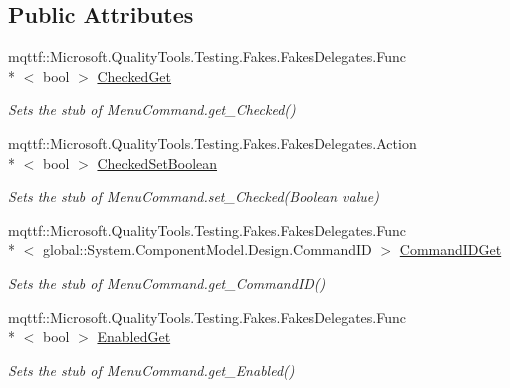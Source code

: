 \subsection*{Public Attributes}
\begin{DoxyCompactItemize}
\item 
mqttf\-::\-Microsoft.\-Quality\-Tools.\-Testing.\-Fakes.\-Fakes\-Delegates.\-Func\\*
$<$ bool $>$ \hyperlink{class_system_1_1_component_model_1_1_design_1_1_fakes_1_1_stub_designer_verb_a52821b4b0a2a7b93e48dc9760683f169}{Checked\-Get}
\begin{DoxyCompactList}\small\item\em Sets the stub of Menu\-Command.\-get\-\_\-\-Checked()\end{DoxyCompactList}\item 
mqttf\-::\-Microsoft.\-Quality\-Tools.\-Testing.\-Fakes.\-Fakes\-Delegates.\-Action\\*
$<$ bool $>$ \hyperlink{class_system_1_1_component_model_1_1_design_1_1_fakes_1_1_stub_designer_verb_a52835685b9410e7c872000f648eb45a7}{Checked\-Set\-Boolean}
\begin{DoxyCompactList}\small\item\em Sets the stub of Menu\-Command.\-set\-\_\-\-Checked(\-Boolean value)\end{DoxyCompactList}\item 
mqttf\-::\-Microsoft.\-Quality\-Tools.\-Testing.\-Fakes.\-Fakes\-Delegates.\-Func\\*
$<$ global\-::\-System.\-Component\-Model.\-Design.\-Command\-I\-D $>$ \hyperlink{class_system_1_1_component_model_1_1_design_1_1_fakes_1_1_stub_designer_verb_ae9c5d2cc11b9b7bde906e83604fb4ee4}{Command\-I\-D\-Get}
\begin{DoxyCompactList}\small\item\em Sets the stub of Menu\-Command.\-get\-\_\-\-Command\-I\-D()\end{DoxyCompactList}\item 
mqttf\-::\-Microsoft.\-Quality\-Tools.\-Testing.\-Fakes.\-Fakes\-Delegates.\-Func\\*
$<$ bool $>$ \hyperlink{class_system_1_1_component_model_1_1_design_1_1_fakes_1_1_stub_designer_verb_ae958ba039a53cee5e3bc63825d40c3bb}{Enabled\-Get}
\begin{DoxyCompactList}\small\item\em Sets the stub of Menu\-Command.\-get\-\_\-\-Enabled()\end{DoxyCompactList}\item 

\end{DoxyCompactItemize}
